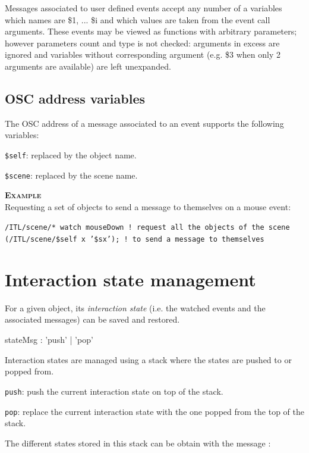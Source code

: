 \documentclass[a4paper,twoside]{report}
\newcommand{\sublevel}[1]	{\section{#1}}
\newcommand{\subsublevel}[1]	{\subsection{#1}}
\newcommand{\OSC}[1]		{\texttt{#1}}
\newcommand{\example}		{\textbf{\hspace{-1.5cm}\textbf{\textsc{Example }}}}
\let\olditemize\itemize
\let\oldenditemize\enditemize
\renewenvironment{itemize} 	{\olditemize \setlength{\itemsep}{1mm}}{\oldenditemize}
\newcommand{\sample}	[1]			{\vspace{-2mm}\begin{center}\colorbox{mygrey}{
								\begin{minipage}[t]{0.9\columnwidth} 
								{\small \texttt{#1}}
								\end{minipage}}\end{center}}
\begin{document}
Messages associated to user defined events accept any number of a variables which names are \$1, ... \$i and which values are taken from the event call arguments. These events may be viewed as functions with arbitrary parameters; however parameters count and type is not checked: arguments in excess are ignored and variables without corresponding argument (e.g. \$3 when only 2 arguments are available) are left unexpanded.




\subsublevel{OSC address variables}
\label{oscvar}
The OSC address of a message associated to an event supports the following variables:
\begin{itemize}
\item \OSC{\$self}: replaced by the object name.
\item \OSC{\$scene}: replaced by the scene name.
\end{itemize}

\example \\
Requesting a set of objects to send a message to themselves on a mouse event:
\sample{/ITL/scene/* watch mouseDown \hspace*{2.4cm}! request all the objects of the scene \\
\hspace*{2.7cm}(/ITL/scene/\$self x '\$sx'); ! to send a message to themselves
}

\sublevel{Interaction state management}
\label{evtstate}

For a given object, its \emph{interaction state} (i.e. the watched events and the associated messages) can be saved and restored.
\begin{rail} 
stateMsg : 'push' | 'pop'
\end{rail}

Interaction states are managed using a stack where the states are pushed to or popped from.
\begin{itemize}
\item \OSC{push}: push the current interaction state on top of the stack.
\item \OSC{pop}: replace the current interaction state with the one popped from the top of the stack.
\end{itemize}

The different states stored in this stack can be obtain with the message :
\end{document}
